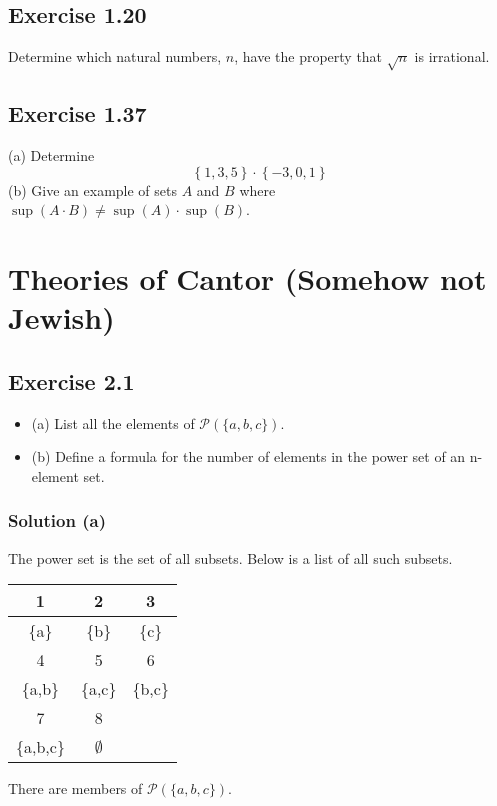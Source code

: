 \documentclass[12pt]{report}
\begin{document}
\pagebreak
\section{Exercise 1.20}
Determine which natural numbers, $n$, have the  property that $\sqrt{n}$ is irrational. 

\pagebreak
\section{Exercise 1.37}
(a) Determine
\[ \left\{1,3,5\right\} \cdot \left\{-3,0,1\right\} \]
(b) Give an example of sets $A$ and $B$ where $\sup(A\cdot B) \ne \sup(A) \cdot \sup(B)$.

\chapter{Theories of Cantor (Somehow not Jewish)}
\section{Exercise 2.1}
\begin{itemize}{}
    \item (a) List all the elements of $\mathcal{P}(\{a,b,c\})$. 
    \item (b) Define a formula for the number of elements in the power set of an n-element set.
\end{itemize}

\subsection{Solution (a)}
The power set is the set of all subsets.
Below is a list of all such subsets.
\begin{center}
    \begin{tabular}{|c|c|c|}
        \hline
        1 & 2 & 3 \\
        \hline
        \{a\} & \{b\} & \{c\} \\
        \hline \hline
        4 & 5 & 6 \\
        \hline
        \{a,b\} & \{a,c\} & \{b,c\} \\
        \hline \hline
        7 & 8 & \\
        \hline
        \{a,b,c\} & $\emptyset$ & \\
        \hline
    \end{tabular}
\end{center}

There are  members of $\mathcal{P}(\{a,b,c\})$. 
\end{document}

